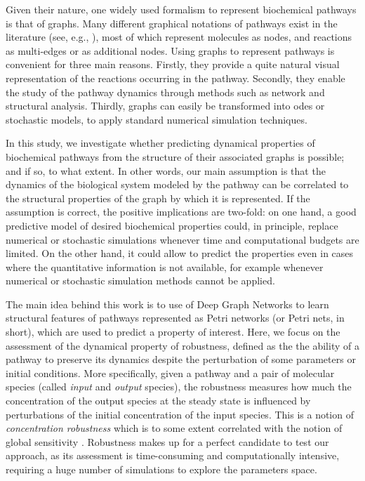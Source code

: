Given their nature, one widely used formalism to represent biochemical pathways is that of graphs. Many different graphical notations of pathways exist in the literature (see, e.g., \citet{karp1994representations,reddy1993petri,le2009systems}), most of which represent molecules as nodes, and reactions as multi-edges or as additional nodes. Using graphs to represent pathways is convenient for three main reasons. Firstly, they provide a quite natural visual representation of the reactions occurring in the pathway. Secondly, they enable the study of the pathway dynamics through methods such as network and structural analysis. Thirdly, graphs can easily be transformed into \glspl{ode} or stochastic models, to apply standard numerical simulation techniques.

In this study, we investigate whether predicting dynamical properties of biochemical pathways from the structure of their associated graphs is possible; and if so, to what extent. In other words, our main assumption is that the dynamics of the biological system modeled by the pathway can be correlated to the structural properties of the graph by which it is represented. If the assumption is correct, the positive implications are two-fold: on one hand, a good predictive model of desired biochemical properties could, in principle, replace numerical or stochastic simulations whenever time and computational budgets are limited. On the other hand, it could allow to predict the properties even in cases where the quantitative information is not available, for example whenever numerical or stochastic simulation methods cannot be applied.

The main idea behind this work is to use of Deep Graph Networks to learn structural features of pathways represented as Petri networks (or Petri nets, in short), which are used to predict a property of interest. Here, we focus on the assessment of the dynamical property of robustness, defined as the the ability of a pathway to preserve its dynamics despite the perturbation of some parameters or initial conditions. More specifically, given a pathway and a pair of molecular species (called \emph{input} and \emph{output} species), the robustness measures how much the concentration of the output species at the steady state is influenced by perturbations of the initial concentration of the input species. This is a notion of \emph{concentration robustness} \citep{kitano2004biological} which is to some extent correlated with the notion of global sensitivity \citep{zi2011sensitivity}. Robustness makes up for a perfect candidate to test our approach, as its assessment is time-consuming and computationally intensive, requiring a huge number of simulations to explore the parameters space.

